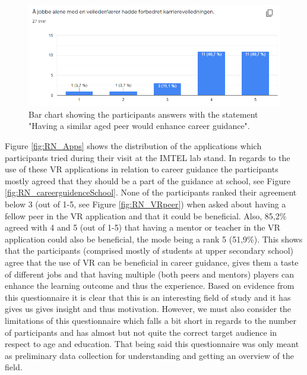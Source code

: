 \begin{figure}[!ht]
    \centering
    \captionsetup{width=.7\linewidth}
    \includegraphics[width=.8\textwidth]{./fig/phase_1/researcherNight/RN_careerguidenceMentor.PNG}
    \caption{Bar chart showing the participants answers with the statement "Having a similar aged peer would enhance career guidance".}
    \label{fig:phase1RNPeer}
\end{figure}

Figure \ref{fig:RN_Apps} shows the distribution of the applications which participants tried during their visit at the IMTEL lab stand.  In regards to the use of these VR applications in relation to career guidance the participants mostly agreed that they should be a part of the guidance at school, see Figure \ref{fig:RN_careerguidenceSchool}. None of the participants ranked their agreement below 3 (out of 1-5, see Figure \ref{fig:RN_VRpeer}) when asked about having a fellow peer in the VR application and that it could be beneficial. Also, 85,2\% agreed with 4 and 5 (out of 1-5) that having a mentor or teacher in the VR application could also be beneficial, the mode being a rank 5 (51,9\%).
This shows that the participants (comprised mostly of students at upper secondary school) agree that the use of VR can be beneficial in career guidance, gives them a taste of different jobs and that having multiple (both peers and mentors) players can enhance the learning outcome and thus the experience. Based on evidence from this questionnaire it is clear that this is an interesting field of study and it has gives us gives insight and thus motivation. However, we must also consider the limitations of this questionnaire which falls a bit short in regards to the number of participants and has almost but not quite the correct target audience in respect to age and education. That being said this questionnaire was only meant as preliminary data collection for understanding and getting an overview of the field.          

